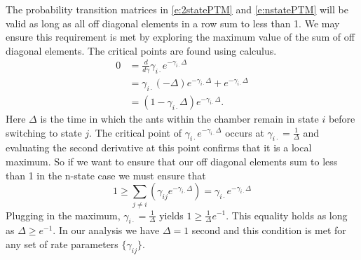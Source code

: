 \documentclass[smallextended]{svjour3}       %
\begin{document}
The probability transition matrices in \eqref{e:2statePTM} and \eqref{e:nstatePTM} will be valid as long as all off diagonal elements in a row sum to less than 1. We may ensure this requirement is met by exploring the maximum value of the sum of off diagonal elements. The critical points are found using calculus.  
% 
\begin{align}
0 &= \frac{d}{d\gamma} \gamma_{i\cdot} e^{-\gamma_{i\cdot}\Delta}\\
&=\gamma_{i\cdot}(-\Delta)e^{-\gamma_{i\cdot}\Delta} + e^{-\gamma_{i\cdot}\Delta}\\
&= (1 - \gamma_{i\cdot}\Delta)e^{-\gamma_{i\cdot}\Delta}.
\end{align}
Here $\Delta$ is the time in which the ants within the chamber remain in state $i$ before switching to state $j$. The critical point of $\gamma_{i\cdot} e^{-\gamma_{i\cdot}\Delta}$ occurs at $\gamma_{i\cdot} = \frac{1}{\Delta}$ and evaluating the second derivative at this point confirms that it is a local maximum. So if we want to ensure that our off diagonal elements sum to less than 1 in the n-state case we must ensure that
% 
\begin{equation}
1 \geq \sum_{j \neq i}\left(\gamma_{ij}e^{-\gamma_{i\cdot}\Delta} \right) = \gamma_{i\cdot}e^{-\gamma_{i\cdot}\Delta}
\end{equation}
        Plugging in the maximum, $\gamma_{i\cdot} = \frac{1}{\Delta}$ yields $1 \geq \frac{1}{\Delta}e^{-1}$. This equality holds as long as $\Delta \geq e^{-1}$. In our analysis we have $\Delta = 1$ second and this condition is met for any set of rate parameters $\{\gamma_{ij}\}$. 
% 
% 
\end{document}
